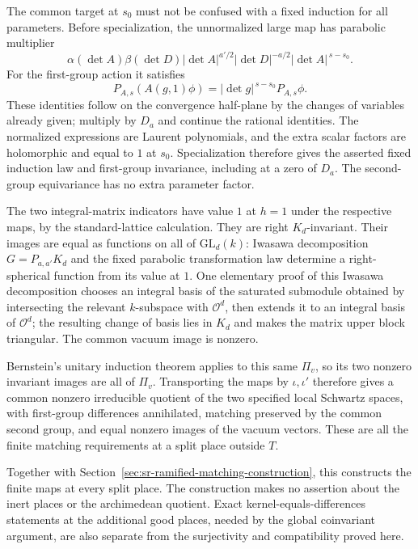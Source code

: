 The common target at \(s_0\) must not be confused with a
fixed induction for all parameters.  Before specialization,
the unnormalized large map has parabolic multiplier
\[
 \alpha(\det A)\beta(\det D)
 |\det A|^{a'/2}|\det D|^{-a/2}
                         |\det A|^{\,s-s_0}.
\]
For the first-group action it satisfies
\[
 P_{A,s}(A(g,1)\phi)
                    =|\det g|^{\,s-s_0}P_{A,s}\phi .
\]
These identities follow on the convergence half-plane by the
changes of variables already given; multiply by \(D_a\)
and continue the rational identities.  The normalized
expressions are Laurent polynomials, and the extra scalar
factors are holomorphic and equal to \(1\) at \(s_0\).
Specialization therefore gives the asserted fixed induction
law and first-group invariance, including at a zero of
\(D_a\).  The second-group equivariance has no extra
parameter factor.

The two integral-matrix indicators have value \(1\) at
\(h=1\) under the respective maps, by the standard-lattice
calculation.  They are right \(K_d\)-invariant.  Their images
are equal as functions on all of \(\mathrm{GL}_d(k)\):
Iwasawa decomposition \(G=P_{a,a'}K_d\) and the fixed
parabolic transformation law determine a right-spherical
function from its value at \(1\).  One elementary proof of
this Iwasawa decomposition chooses an integral basis of the
saturated submodule obtained by intersecting the relevant
\(k\)-subspace with \(\mathcal O^d\), then extends it to an
integral basis of \(\mathcal O^d\); the resulting change of
basis lies in \(K_d\) and makes the matrix upper block
triangular.  The common vacuum image is nonzero.

Bernstein's unitary induction theorem applies to this same
\(\Pi_v\), so its two nonzero invariant images are all of
\(\Pi_v\).  Transporting the maps by \(\iota,\iota'\) therefore
gives a common nonzero irreducible quotient of the two
specified local Schwartz spaces, with first-group differences
annihilated, matching preserved by the common second group,
and equal nonzero images of the vacuum vectors.
These are all the finite matching requirements at a split
place outside \(T\).

Together with
Section~\ref{sec:sr-ramified-matching-construction}, this
constructs the finite maps at every split place.  The
construction makes no assertion about the inert places or
the archimedean quotient.  Exact kernel-equals-differences
statements at the additional good places, needed by the
global coinvariant argument, are also separate from the
surjectivity and compatibility proved here.


